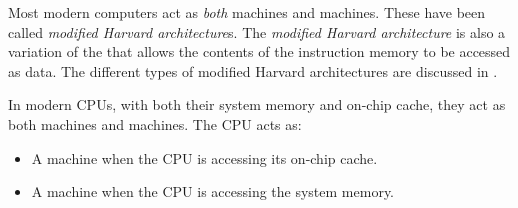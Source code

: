 \begin{definition}\label{def:Modified_Harvard_Architecture}
  Most modern computers act as \emph{both}  machines and  machines.
  These have been called \emph{modified Harvard architecture}s.
  The \emph{modified Harvard architecture} is also a variation of the  that allows the contents of the instruction memory to be accessed as data.
  The different types of modified Harvard architectures are discussed in .

  \begin{remark}\label{rmk:Modern_CPU_Architecture}
    In modern CPUs, with both their system memory and on-chip cache, they act as both  machines and  machines.
    The CPU acts as:
    \begin{itemize}[noitemsep]
    \item A  machine when the CPU is accessing its on-chip cache.
    \item A  machine when the CPU is accessing the system memory.
    \end{itemize}
  \end{remark}


\end{definition}
